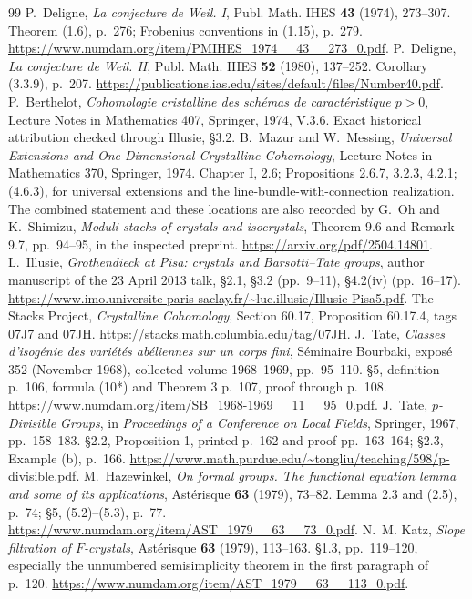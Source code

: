 \documentclass[11pt,a4paper]{article}
\theoremstyle{definition}\newtheorem{remark}[theorem]{Remark}
\begin{document}
\begin{thebibliography}{99}
 P.~Deligne, \emph{La conjecture de Weil. I}, Publ. Math. IHES \textbf{43} (1974), 273--307. Theorem (1.6), p.~276; Frobenius conventions in (1.15), p.~279. \url{https://www.numdam.org/item/PMIHES_1974__43__273_0.pdf}.
 P.~Deligne, \emph{La conjecture de Weil. II}, Publ. Math. IHES \textbf{52} (1980), 137--252. Corollary (3.3.9), p.~207. \url{https://publications.ias.edu/sites/default/files/Number40.pdf}.
 P.~Berthelot, \emph{Cohomologie cristalline des sch\'emas de caract\'eristique $p>0$}, Lecture Notes in Mathematics 407, Springer, 1974, V.3.6. Exact historical attribution checked through Illusie, \S3.2.
 B.~Mazur and W.~Messing, \emph{Universal Extensions and One Dimensional Crystalline Cohomology}, Lecture Notes in Mathematics 370, Springer, 1974. Chapter I, 2.6; Propositions 2.6.7, 3.2.3, 4.2.1; (4.6.3), for universal extensions and the line-bundle-with-connection realization. The combined statement and these locations are also recorded by G.~Oh and K.~Shimizu, \emph{Moduli stacks of crystals and isocrystals}, Theorem 9.6 and Remark 9.7, pp.~94--95, in the inspected preprint. \url{https://arxiv.org/pdf/2504.14801}.
 L.~Illusie, \emph{Grothendieck at Pisa: crystals and Barsotti--Tate groups}, author manuscript of the 23 April 2013 talk, \S2.1, \S3.2 (pp.~9--11), \S4.2(iv) (pp.~16--17). \url{https://www.imo.universite-paris-saclay.fr/~luc.illusie/Illusie-Pisa5.pdf}.
 The Stacks Project, \emph{Crystalline Cohomology}, Section 60.17, Proposition 60.17.4, tags 07J7 and 07JH. \url{https://stacks.math.columbia.edu/tag/07JH}.
 J.~Tate, \emph{Classes d'isog\'enie des vari\'et\'es ab\'eliennes sur un corps fini}, S\'eminaire Bourbaki, expos\'e 352 (November 1968), collected volume 1968--1969, pp.~95--110. \S5, definition p.~106, formula (10*) and Theorem 3 p.~107, proof through p.~108. \url{https://www.numdam.org/item/SB_1968-1969__11__95_0.pdf}.
 J.~Tate, \emph{$p$-Divisible Groups}, in \emph{Proceedings of a Conference on Local Fields}, Springer, 1967, pp.~158--183. \S2.2, Proposition 1, printed p.~162 and proof pp.~163--164; \S2.3, Example (b), p.~166. \url{https://www.math.purdue.edu/~tongliu/teaching/598/p-divisible.pdf}.
 M.~Hazewinkel, \emph{On formal groups. The functional equation lemma and some of its applications}, Ast\'erisque \textbf{63} (1979), 73--82. Lemma 2.3 and (2.5), p.~74; \S5, (5.2)--(5.3), p.~77. \url{https://www.numdam.org/item/AST_1979__63__73_0.pdf}.
 N.~M. Katz, \emph{Slope filtration of $F$-crystals}, Ast\'erisque \textbf{63} (1979), 113--163. \S1.3, pp.~119--120, especially the unnumbered semisimplicity theorem in the first paragraph of p.~120. \url{https://www.numdam.org/item/AST_1979__63__113_0.pdf}.

\end{thebibliography}
\end{document}
